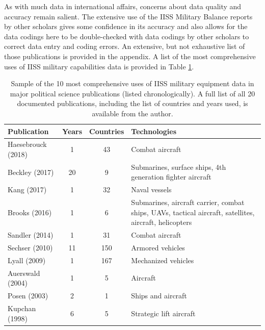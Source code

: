\documentclass[
]{article}
\begin{document}
As with much data in international affairs, concerns about data quality and accuracy remain salient. The extensive use of the IISS Military Balance reports by other scholars gives some confidence in its accuracy and also allows for the data codings here to be double-checked with data codings by other scholars to correct data entry and coding errors. An extensive, but not exhaustive list of those publications is provided in the appendix. A list of the most comprehensive uses of IISS military capabilities data is provided in Table \ref{table:iiss_litreview}.

\begin{singlespace}
    \begin{table}[h]
      \centering
      \caption[Prior use of IISS data]{Sample of the 10 most comprehensive uses of IISS military equipment data in major political science publications (listed chronologically). A full list of all 20 documented publications, including the list of countries and years used, is available from the author.}
      \begin{tabular}{|p{5.5cm}|c|c|p{6cm}|}
            \hline 
            \textbf{Publication} & \textbf{Years} & \textbf{Countries} & \textbf{Technologies} \\ 
            \hline 
            Haesebrouck (2018) & 1 & 43 & Combat aircraft \\ 
            \hline 
            Beckley (2017) & 20 & 9 & Submarines, surface ships, 4th generation fighter aircraft \\ 
            \hline 
            Kang (2017) & 1 & 32 & Naval vessels \\ 
            \hline 
            Brooks (2016) & 1 & 6 & Submarines, aircraft carrier, combat ships, UAVs, tactical aircraft, satellites, aircraft, helicopters \\ 
            \hline 
            Sandler (2014) & 1 & 31 & Combat aircraft \\ 
            \hline 
            Sechser (2010) & 11 & 150 & Armored vehicles \\
            \hline
            Lyall (2009) & 1 & 167 & Mechanized vehicles \\ 
            \hline
            Auerswald (2004) & 1 & 5 & Aircraft \\ 
            \hline 
            Posen (2003) & 2 & 1 & Ships and aircraft \\ 
            \hline 
            Kupchan (1998) & 6 & 5 & Strategic lift aircraft \\ 
            \hline 
        \end{tabular} 
        \label{table:iiss_litreview}
    \end{table}
    \end{singlespace}
\end{document}
